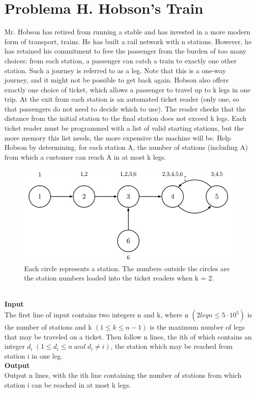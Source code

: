 \documentclass{report}
\begin{document}
\section{Problema H. Hobson's Train}
Mr. Hobson has retired from running a stable and has invested in a more modern form of transport,
trains. He has built a rail network with n stations. However, he has retained his commitment to free
the passenger from the burden of too many choices: from each station, a passenger can catch a train to
exactly one other station. Such a journey is referred to as a leg. Note that this is a one-way journey, and
it might not be possible to get back again.
Hobson also offers exactly one choice of ticket, which allows a passenger to travel up to k legs in one
trip. At the exit from each station is an automated ticket reader (only one, so that passengers do not need
to decide which to use). The reader checks that the distance from the initial station to the final station
does not exceed k legs.
Each ticket reader must be programmed with a list of valid starting stations, but the more memory this
list needs, the more expensive the machine will be. Help Hobson by determining, for each station A, the
number of stations (including A) from which a customer can reach A in at most k legs.
\begin{figure}[h]
	\begin{center}\includegraphics[scale=0.45]{Train}\end{center}
	\caption{Each circle represents a station. The numbers
		outside the circles are the station numbers loaded into the ticket readers when k = 2.}	
	\label{Train}
\end{figure}\\
{\bf Input}\\
The first line of input contains two integers n and k, where n $(2 leq n \leq 5 · 10^5)$ is the number of stations
and k $(1 \leq k \leq n − 1)$ is the maximum number of legs that may be traveled on a ticket. Then follow n
lines, the ith of which contains an integer $d_i\; (1 \leq d_i \leq n \;and\; d_i \ne i)$, the station which may be reached
from station i in one leg.\\
{\bf Output}\\
Output n lines, with the ith line containing the number of stations from which station i can be reached
in at most k legs.\\
\end{document}
